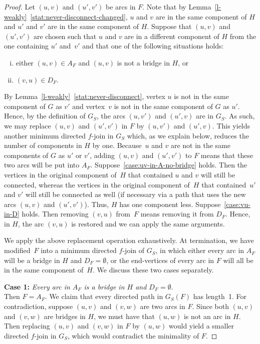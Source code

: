 \documentclass[11pt]{llncs}
\newcommand\displaycase[1]{{\bf #1}}
\begin{document}
\begin{proof}
Let $(u,v)$ and $(u',v')$ be arcs in $F$.  Note that by
Lemma~\ref{l-weakly}~\ref{stat:never-disconnect-changed}, $u$ and $v$ are in the same component of $H$ and
$u'$ and $v'$ are in the same component of $H$.  Suppose that $(u,v)$ and
$(u',v')$ are chosen such that $u$ and $v$ are in a different component of $H$
from the one containing $u'$  and~$v'$ and that one of the following situations
holds:
\begin{enumerate}[(i)]
\renewcommand{\theenumi}{(\roman{enumi})}
\renewcommand\labelenumi{\theenumi}
\item \label{case:uv-in-A-no-bridge} either $(u,v) \in A_F$ and $(u,v)$ is not a bridge in $H$, or
\item \label{case:vu-in-D} $(v,u) \in D_F$.
\end{enumerate}
By Lemma~\ref{l-weakly}~\ref{stat:never-disconnect}, vertex $u$ is not in the same component of $G$ as
$v'$ and vertex~$v$ is not in the same component of $G$ as $u'$. Hence, by the
definition of $G_S$, the arcs $(u,v')$ and $(u',v)$ are in $G_S$.  As such, we
may replace $(u,v)$ and $(u',v')$ in $F$ by $(u,v')$ and $(u',v)$. This yields
another minimum directed $f$-join in $G_S$ which, as we explain below, reduces
the number of components in $H$ by one.  Because~$u$ and $v$ are not in the
same components of $G$ as $u'$ or $v'$, adding $(u,v)$ and $(u',v')$  to $F$
means that these two arcs will be put into $A_F$.  Suppose~\ref{case:uv-in-A-no-bridge} holds. Then the
vertices in the original component of~$H$ that contained $u$ and $v$ will still
be connected, whereas the vertices in the original component of~$H$ that
contained~$u'$ and $v'$ will still be connected as well (if necessary via a path
that uses the new arcs $(u,v)$ and $(u',v')$). Thus, $H$ has one component
less.  Suppose~\ref{case:vu-in-D} holds.  Then removing $(v,u)$ from~$F$ means removing it
from $D_F$. Hence, in $H$, the arc $(v,u)$ is restored and we can apply the
same arguments.

We apply the above replacement operation exhaustively. At termination, we have
modified~$F$ into a minimum directed $f$-join of $G_S$, in which either every
arc in $A_F$ will be a bridge in $H$ and $D_F=\emptyset$, or the end-vertices
of every arc in $F$ will all be in the same component of~$H$.  We discuss these
two cases separately.

\medskip
\noindent
\displaycase{Case 1:} {\em Every arc in $A_F$ is a bridge in $H$ and $D_F=\emptyset$}.\\ 
Then $F=A_F$. We claim that every directed path in $G_S(F)$ has length~1.  For
contradiction, suppose $(u,v)$ and $(v,w)$ are two arcs in $F$.  Since both
$(u,v)$ and $(v,w)$ are bridges in $H$, we must have that $(u,w)$ is not an arc
in $H$.  Then replacing $(u,v)$ and $(v,w)$ in $F$ by $(u,w)$ would yield a
smaller directed $f$-join in $G_S$, which would contradict the minimality of
$F$.


\end{proof}
\end{document}
